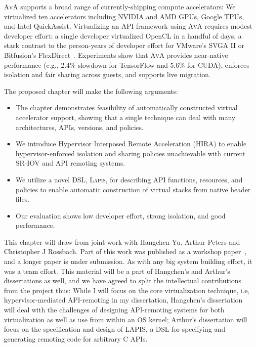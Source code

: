 \textsc{AvA} supports a broad range of currently-shipping compute accelerators:
We virtualized ten accelerators including NVIDIA and AMD GPUs, Google TPUs,
and Intel QuickAssist.
Virtualizing an API framework using \textsc{AvA} requires modest developer
effort:
a single developer virtualized OpenCL in a handful of days,
a stark contrast to the person-years of developer effort for VMware's SVGA II
or Bitfusion's FlexDirect~\cite{bitfusion}.
Experiments show that \textsc{AvA} provides near-native performance (e.g., 2.4\% slowdown for TensorFlow and 5.6\% for CUDA), enforces isolation and fair sharing across guests, and supports live migration.

The proposed chapter will make the following arguments:

\begin{itemize}[nosep,leftmargin=1em,labelwidth=*,align=left]
\item The chapter demonstrates feasibility of automatically constructed virtual accelerator support, showing that a single technique can deal with many architectures, APIs, versions, and policies.
\item We introduce {{H}ypervisor {I}nterposed {R}emote {A}cceleration} (HIRA) to enable hypervisor-enforced isolation and sharing policies unachievable with current SR-IOV and API remoting systems.
\item We utilize a novel DSL, \textsc{Lapis}, for describing API functions, resources, and policies to enable automatic construction of virtual stacks from native header files.
\item Our evaluation shows low developer effort, strong isolation, and good performance.
\end{itemize}

This chapter will draw from joint work with Hangchen Yu, Arthur Peters and
Christopher J Rossbach. Part of this work was published as a workshop
paper~\cite{ava-hotos}, and a longer paper is under submission. As with any
big system building effort, it was a team effort. This material will be a part
of Hangchen's and Arthur's dissertations as well, and we have agreed to split
the intellectual contributions from the project thus: While I will focus on
the core virtualization technique, i.e, hypervisor-mediated API-remoting in my
dissertation, Hangchen's dissertation will deal with the challenges of
designing API-remoting systems for both virtualization as well as use from
within an OS kernel; Arthur's dissertation will focus on the specification and
design of LAPIS, a DSL for specifying and generating remoting code for
arbitrary C APIs.